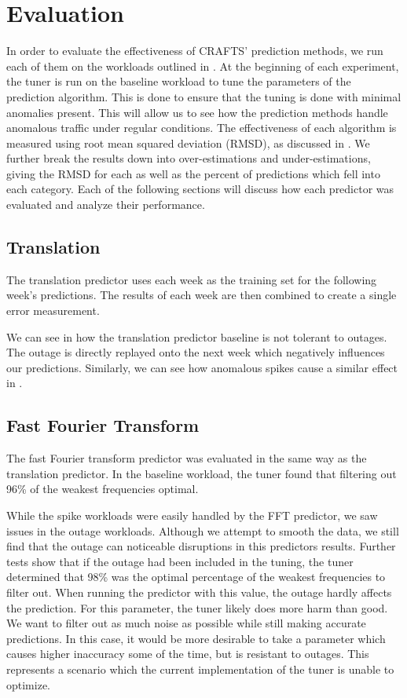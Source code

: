 \chapter{Evaluation}

In order to evaluate the effectiveness of CRAFTS' prediction methods, we run each of them on the workloads outlined in . At the beginning of each experiment, the tuner is run on the baseline workload to tune the parameters of the prediction algorithm. This is done to ensure that the tuning is done with minimal anomalies present. This will allow us to see how the prediction methods handle anomalous traffic under regular conditions. The effectiveness of each algorithm is measured using root mean squared deviation (RMSD), as discussed in . We further break the results down into over-estimations and under-estimations, giving the RMSD for each as well as the percent of predictions which fell into each category. Each of the following sections will discuss how each predictor was evaluated and analyze their performance.

\section{Translation}
The translation predictor uses each week as the training set for the following week's predictions. The results of each week are then combined to create a single error measurement.

We can see in  how the translation predictor baseline is not tolerant to outages. The outage is directly replayed onto the next week which negatively influences our predictions. Similarly, we can see how anomalous spikes cause a similar effect in .



\section{Fast Fourier Transform}
The fast Fourier transform predictor was evaluated in the same way as the translation predictor. In the baseline workload, the tuner found that filtering out 96\% of the weakest frequencies optimal.

While the spike workloads were easily handled by the FFT predictor, we saw issues in the outage workloads. Although we attempt to smooth the data, we still find that the outage can noticeable disruptions in this predictors results. Further tests show that if the outage had been included in the tuning, the tuner determined that 98\% was the optimal percentage of the weakest frequencies to filter out. When running the predictor with this value, the outage hardly affects the prediction. For this parameter, the tuner likely does more harm than good. We want to filter out as much noise as possible while still making accurate predictions. In this case, it would be more desirable to take a parameter which causes higher inaccuracy some of the time, but is resistant to outages. This represents a scenario which the current implementation of the tuner is unable to optimize.

